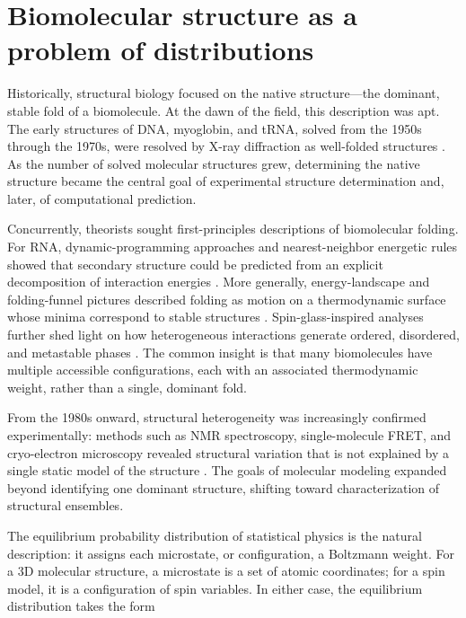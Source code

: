 
\label{ch1:intro}

\section{Biomolecular structure as a problem of distributions}
\label{ch1:sec:biomolecular-distributions}

Historically, structural biology focused on the native structure---the dominant, stable fold of a biomolecule. At the dawn of the field, this description was apt. The early structures of DNA, myoglobin, and tRNA, solved from the 1950s through the 1970s, were resolved by X-ray diffraction as well-folded structures \citep{Watson1953DNA,Kendrew1958Myoglobin,Kim1974tRNA}. As the number of solved molecular structures grew, determining the native structure became the central goal of experimental structure determination and, later, of computational prediction.

Concurrently, theorists sought first-principles descriptions of biomolecular folding. For RNA, dynamic-programming approaches and nearest-neighbor energetic rules showed that secondary structure could be predicted from an explicit decomposition of interaction energies \citep{Nussinov1980FastAlgorithm,Mathews1999ThermodynamicParameters}. More generally, energy-landscape and folding-funnel pictures described folding as motion on a thermodynamic surface whose minima correspond to stable structures \citep{Bryngelson1987ProteinFolding,Wales2018EnergyLandscapes}. Spin-glass-inspired analyses further shed light on how heterogeneous interactions generate ordered, disordered, and metastable phases \citep{Bryngelson1987ProteinFolding,Pagnani2000Glassy}. The common insight is that many biomolecules have multiple accessible configurations, each with an associated thermodynamic weight, rather than a single, dominant fold.

From the 1980s onward, structural heterogeneity was increasingly confirmed experimentally: methods such as NMR spectroscopy, single-molecule FRET, and cryo-electron microscopy revealed structural variation that is not explained by a single static model of the structure \citep{Purcell1946NMR,Roy2008SingleMoleculeFRET,Kuhlbrandt2014ResolutionRevolution}. The goals of molecular modeling expanded beyond identifying one dominant structure, shifting toward characterization of structural ensembles.

The equilibrium probability distribution of statistical physics is the natural description: it assigns each microstate, or configuration, a Boltzmann weight. For a 3D molecular structure, a microstate is a set of atomic coordinates; for a spin model, it is a configuration of spin variables. In either case, the equilibrium distribution takes the form \citep{McQuarrie1976StatisticalMechanics}

